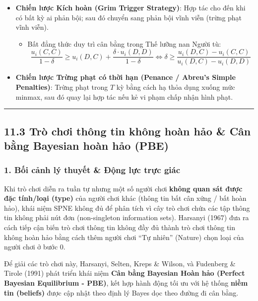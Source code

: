 \documentclass[
]{article}
\providecommand{\tightlist}{%
  \setlength{\itemsep}{0pt}\setlength{\parskip}{0pt}}
\begin{document}
\begin{itemize}
\tightlist
\item
  \textbf{Chiến lược Kích hoàn (Grim Trigger Strategy)}: Hợp tác cho đến
  khi có bất kỳ ai phản bội; sau đó chuyển sang phản bội vĩnh viễn
  (trừng phạt vĩnh viễn).

  \begin{itemize}
  \tightlist
  \item
    Bất đẳng thức duy trì cân bằng trong Thế lưỡng nan Người tù:
    \[ \frac{u_i(C, C)}{1 - \delta} \ge u_i(D, C) + \frac{\delta \cdot u_i(D, D)}{1 - \delta} \iff \delta \ge \frac{u_i(D, C) - u_i(C, C)}{u_i(D, C) - u_i(D, D)} \]
  \end{itemize}
\item
  \textbf{Chiến lược Trừng phạt có thời hạn (Penance / Abreu's Simple
  Penalties)}: Trừng phạt trong \(T\) kỳ bằng cách hạ thỏa dụng xuống
  mức minmax, sau đó quay lại hợp tác nếu kẻ vi phạm chấp nhận hình
  phạt.
\end{itemize}

\begin{center}\rule{0.5\linewidth}{0.5pt}\end{center}

\subsection{11.3 Trò chơi thông tin không hoàn hảo \& Cân bằng Bayesian
hoàn hảo
(PBE)}\label{truxf2-chux1a1i-thuxf4ng-tin-khuxf4ng-houxe0n-hux1ea3o-cuxe2n-bux1eb1ng-bayesian-houxe0n-hux1ea3o-pbe}

\subsubsection{1. Bối cảnh lý thuyết \& Động lực trực
giác}\label{bux1ed1i-cux1ea3nh-luxfd-thuyux1ebft-ux111ux1ed9ng-lux1ef1c-trux1ef1c-giuxe1c-2}

Khi trò chơi diễn ra tuần tự nhưng một số người chơi \textbf{không quan
sát được đặc tính/loại (type)} của người chơi khác (thông tin bất cân
xứng / bất hoàn hảo), khái niệm SPNE không đủ để phân tích vì cây trò
chơi chứa các tập thông tin không phải nút đơn (non-singleton
information sets). Harsanyi (1967) đưa ra cách tiếp cận biến trò chơi
thông tin không đầy đủ thành trò chơi thông tin không hoàn hảo bằng cách
thêm người chơi ``Tự nhiên'' (Nature) chọn loại của người chơi ở bước 0.

Để giải các trò chơi này, Harsanyi, Selten, Kreps \& Wilson, và
Fudenberg \& Tirole (1991) phát triển khái niệm \textbf{Cân bằng
Bayesian Hoàn hảo (Perfect Bayesian Equilibrium - PBE)}, kết hợp hành
động tối ưu với hệ thống \textbf{niềm tin (beliefs)} được cập nhật theo
định lý Bayes dọc theo đường đi cân bằng.
\end{document}
